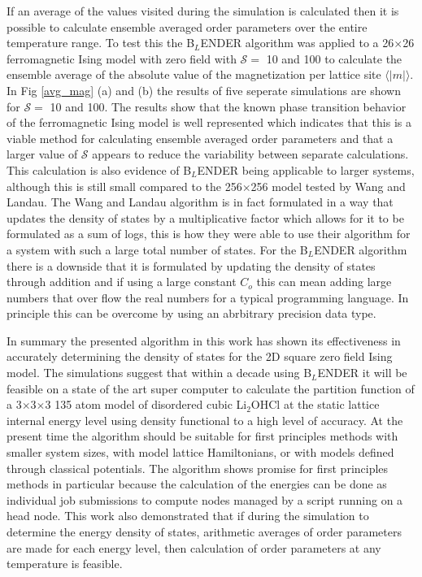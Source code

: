 \documentclass[aps,prl,reprint,superscriptaddress,showkeys]{revtex4-1}
\begin{document}
If an average of the values visited  during the simulation is calculated then it is possible to calculate ensemble averaged order parameters over the entire temperature range.  To test this the B$_L$ENDER algorithm was applied to a 26$\times$26 ferromagnetic Ising model with zero field with $\mathcal{S}=$ 10 and 100 to calculate the ensemble average of the absolute value of the magnetization per lattice site $\langle |m| \rangle$. In Fig \ref{avg_mag} (a) and (b) the results of five seperate simulations are shown for $\mathcal{S}=$ 10 and 100.  The results show that the known phase transition behavior of the ferromagnetic Ising model is well represented which indicates that this is a viable method for calculating ensemble averaged order parameters and that a larger value of $\mathcal{S}$ appears to reduce the variability between separate calculations.  This calculation is also evidence of B$_L$ENDER being applicable to larger systems, although this is still small compared to the 256$\times$256 model tested by Wang and Landau. The Wang and Landau algorithm is in fact formulated in a way that updates the  density of states by a multiplicative factor which allows for it to be formulated as a sum of logs, this is how they were able to use their algorithm for a system with such a large total number of states.  For the B$_L$ENDER algorithm there is a downside that it is formulated by updating the  density of states through addition and if using a large constant $C_o$  this can mean adding large numbers that over flow the real numbers for a typical programming language. In principle this can be overcome by using an  abrbitrary precision data type. 

In summary the presented algorithm in this work has shown its effectiveness in accurately determining the density of states for the 2D square zero field Ising model.  The simulations suggest that within a decade using B$_L$ENDER   it will be feasible on a state of the art super computer to calculate the partition function of a 3$\times$3$\times$3 135 atom model of disordered cubic Li$_2$OHCl at the static lattice internal energy level using  density functional to a high level of accuracy. At the present time the algorithm should be suitable for first principles methods with smaller system sizes, with model lattice Hamiltonians, or with models defined through classical potentials. The algorithm shows promise for first principles methods in particular because the calculation of the energies can be done as individual job submissions to compute nodes managed by a script running on a head node. This work also demonstrated that if during the simulation to determine the energy density of states, arithmetic  averages of order parameters are made for each energy level, then calculation of order parameters at any temperature is feasible. 


\end{document}
